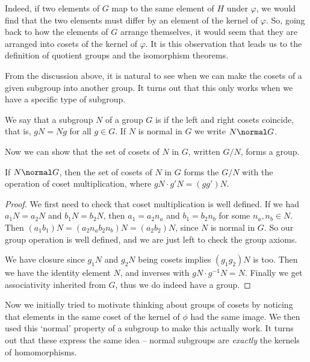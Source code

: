 Indeed, if two elements of $G$ map to the same element of $H$ under $\varphi$, we would find that the two elements must differ by an element of the kernel of $\varphi$. So, going back to how the elements of $G$ arrange themselves, it would seem that they are arranged into cosets of the kernel of $\varphi$. It is this observation that leads us to the definition of quotient groups and the isomorphism theorems.


From the discussion above, it is natural to see when we can make the cosets of a given subgroup into another group. It turns out that this only works when we have a specific type of subgroup.

\begin{definition}
	We say that a subgroup $N$ of a group $G$ is  if the left and right cosets coincide, that is, $gN = Ng$ for all $g \in G$. If $N$ is normal in $G$ we write $N \normal G$.
\end{definition}

Now we can show that the set of cosets of $N$ in $G$, written $G/N$, forms a group.

\begin{theorem}
	If $N \normal G$, then the set of cosets of $N$ in $G$ forms the  $G/N$ with the operation of coset multiplication, where $gN \cdot g'N = (g g')N$.
\end{theorem}
\begin{proof}
	We first need to check that coset multiplication is well defined. If we had $a_1 N = a_2N$ and $b_1 N = b_2 N$, then $a_1 = a_2 n_a$ and $b_1 = b_2 n_b$ for some $n_a, n_b \in N$. Then $(a_1 b_1)N = (a_2 n_a b_2 n_b)N = (a_2 b_2)N$, since $N$ is normal in $G$. So our group operation is well defined, and we are just left to check the group axioms.

	We have closure since $g_1 N$ and $g_2N$ being cosets implies $(g_1 g_2)N$ is too. Then we have the identity element $N$, and inverses with $gN \cdot g^{-1}N = N$. Finally we get associativity inherited from $G$, thus we do indeed have a group.
\end{proof}

Now we initially tried to motivate thinking about groups of cosets by noticing that elements in the same coset of the kernel of $\phi$ had the same image. We then used this `normal' property of a subgroup to make this actually work. It turns out that these express the same idea -- normal subgroups are \emph{exactly} the kernels of homomorphisms.

